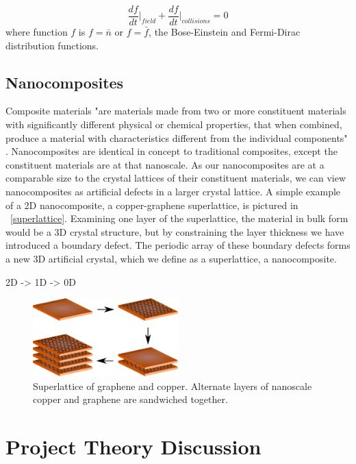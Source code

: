 \documentclass[a4paper,10pt,journal]{IEEEtran}
\newcommand{\figref}[2][\figurename~]{#1\ref{#2}}
\begin{document}
\begin{equation}
\label{boltz-specific}
	\frac{df}{dt}\bigg|_{field} + \frac{df}{dt}\bigg|_{collisions} = 0
\end{equation}
where function $f$ is $f = \bar{n}$ or $f = \bar{f}$, the Bose-Einstein
and Fermi-Dirac distribution functions.

\subsection{Nanocomposites}

Composite materials "are materials made from two or more constituent
materials with significantly different physical or chemical
properties, that when combined, produce a material with
characteristics different from the individual
components" \cite{wiki-composite}. Nanocomposites are identical in
concept to traditional composites, except the constituent materials
are at that nanoscale. As our nanocomposites are at a comparable size
to the crystal lattices of their constituent materials, we can view
nanocomposites as artificial defects in a larger crystal lattice. A
simple example of a 2D nanocomposite, a copper-graphene superlattice,
is pictured in \figref{superlattice}. Examining one layer of the
superlattice, the material in bulk form would be a 3D crystal structure,
but by constraining the layer thickness we have introduced a boundary
defect. The periodic array of these boundary defects forms a new 3D
artificial crystal, which we define as a superlattice, a nanocomposite.

2D -> 1D -> 0D

\begin{figure}
	\centering
	\includegraphics[width=0.5\textwidth]{graphene-superlattice.eps}
	\caption{Superlattice of graphene and copper. Alternate layers of
	nanoscale copper and graphene are sandwiched together.}
\end{figure}

\section{Project Theory Discussion}
\end{document}
